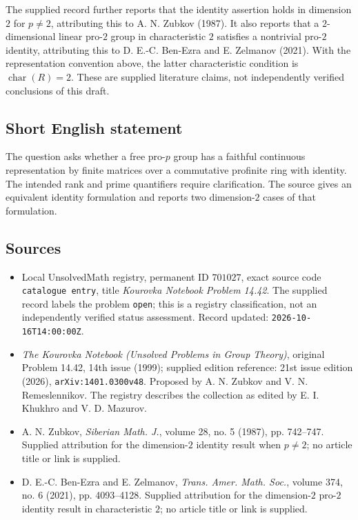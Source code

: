 \documentclass[11pt]{article}
\begin{document}
The supplied record further reports that the identity assertion holds in dimension $2$ for $p\neq 2$, attributing this to A. N. Zubkov (1987). It also reports that a $2$-dimensional linear pro-$2$ group in characteristic $2$ satisfies a nontrivial pro-$2$ identity, attributing this to D. E.-C. Ben-Ezra and E. Zelmanov (2021). With the representation convention above, the latter characteristic condition is $\operatorname{char}(R)=2$. These are supplied literature claims, not independently verified conclusions of this draft.
\subsection{Short English statement}
The question asks whether a free pro-$p$ group has a faithful continuous representation by finite matrices over a commutative profinite ring with identity. The intended rank and prime quantifiers require clarification. The source gives an equivalent identity formulation and reports two dimension-$2$ cases of that formulation.
\subsection{Sources}
\begin{itemize}
\item Local UnsolvedMath registry, permanent ID $701027$, exact source code \texttt{catalogue entry}, title \emph{Kourovka Notebook Problem 14.42}. The supplied record labels the problem \texttt{open}; this is a registry classification, not an independently verified status assessment. Record updated: \texttt{2026-10-16T14:00:00Z}.
\item \emph{The Kourovka Notebook (Unsolved Problems in Group Theory)}, original Problem 14.42, 14th issue (1999); supplied edition reference: 21st issue edition (2026), \texttt{arXiv:1401.0300v48}. Proposed by A. N. Zubkov and V. N. Remeslennikov. The registry describes the collection as edited by E. I. Khukhro and V. D. Mazurov.
\item A. N. Zubkov, \emph{Siberian Math. J.}, volume 28, no. 5 (1987), pp. 742--747. Supplied attribution for the dimension-$2$ identity result when $p\neq 2$; no article title or link is supplied.
\item D. E.-C. Ben-Ezra and E. Zelmanov, \emph{Trans. Amer. Math. Soc.}, volume 374, no. 6 (2021), pp. 4093--4128. Supplied attribution for the dimension-$2$ pro-$2$ identity result in characteristic $2$; no article title or link is supplied.
\end{itemize}
\end{document}
